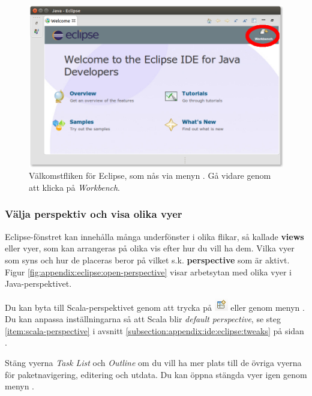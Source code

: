 \begin{figure}[H]
\centering
\includegraphics[width=1.0\textwidth]{../img/eclipse/eclipse-welcome.png}
\caption{Välkomstfliken för Eclipse, som nås via menyn . Gå vidare genom att klicka på \textit{Workbench}.}
\label{fig:appendix:eclipse:welcome}
\end{figure}

\subsubsection{Välja perspektiv och visa olika vyer}

Eclipse-fönstret kan innehålla många underfönster i olika flikar, så kallade \textbf{views} eller vyer, som kan arrangeras på olika vis efter hur du vill ha dem. Vilka vyer som syns och hur de placeras beror på vilket s.k. \textbf{perspective} som är aktivt.  Figur \ref{fig:appendix:eclipse:open-perspective} visar arbetsytan med olika vyer i Java-perspektivet. 

Du kan byta till Scala-perspektivet genom att trycka på \includegraphics[scale=0.75]{../img/eclipse/eclipse-perspective-button.png} eller genom menyn .
Du kan anpassa inställningarna så att Scala blir \textit{default perspective}, se steg \ref{item:scala-perspective} i avsnitt \ref{subsection:appendix:ide:eclipse:tweaks} på sidan \pageref{subsection:appendix:ide:eclipse:tweaks}.

Stäng vyerna \textit{Task List} och \textit{Outline} om du vill ha mer plats till de övriga vyerna för paketnavigering, editering och utdata. Du kan öppna stängda vyer igen genom menyn . 

